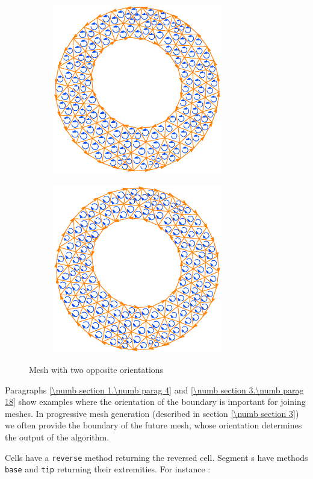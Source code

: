 \begin{figure}[ht] \centering
\begin{subfigure}{75mm}\centering
  \includegraphics[width=74mm]{oriented-annulus-1}
\end{subfigure}  
\begin{subfigure}{75mm}\centering
  \includegraphics[width=74mm]{oriented-annulus-2}
\end{subfigure}  
  \caption{Mesh with two opposite orientations}
  \label{\numb section 1.\numb fig 4}
\end{figure}

Paragraphs \ref{\numb section 1.\numb parag 4} and \ref{\numb section 3.\numb parag 18}
show examples where the orientation of the boundary is important for joining meshes.
In progressive mesh generation (described in section \ref{\numb section 3}) we often
provide the boundary of the future mesh, whose orientation determines the output of the
algorithm.

Cells have a {\small\tt reverse} method returning the reversed cell.
Segment {\small\tt {}}s have methods {\small\tt base} and {\small\tt tip} returning their extremities.
For instance :

